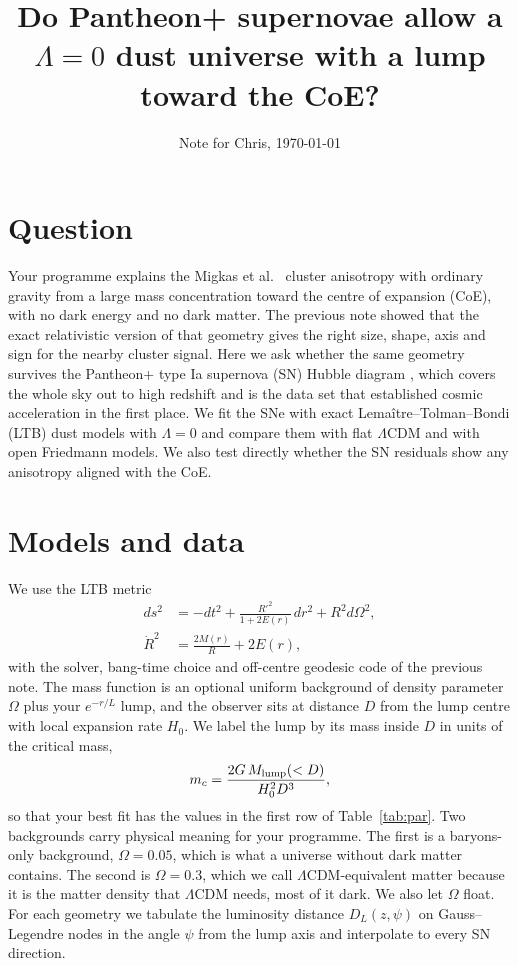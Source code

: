 \documentclass[10pt,twocolumn,letterpaper]{article}
\title{\vspace{-0.6in}\Large Do Pantheon+ supernovae allow a $\Lambda=0$ dust universe with a lump toward the CoE?}
\author{Note for Chris, \today}
\date{\vspace{-0.35in}}
\begin{document}
\maketitle

\section{Question}
Your programme explains the Migkas et al.\ \cite{Migkas2020,Migkas2021} cluster anisotropy with ordinary gravity from a large mass concentration toward the centre of expansion (CoE), with no dark energy and no dark matter. The previous note showed that the exact relativistic version of that geometry gives the right size, shape, axis and sign for the nearby cluster signal. Here we ask whether the same geometry survives the Pantheon+ type Ia supernova (SN) Hubble diagram \cite{Scolnic2022,Brout2022}, which covers the whole sky out to high redshift and is the data set that established cosmic acceleration in the first place. We fit the SNe with exact Lema\^itre--Tolman--Bondi (LTB) dust models with $\Lambda=0$ and compare them with flat $\Lambda$CDM and with open Friedmann models. We also test directly whether the SN residuals show any anisotropy aligned with the CoE.

\section{Models and data}
We use the LTB metric \cite{Bondi1947,Bolejko2011}
\begin{equation}\label{eq:ltb}
\begin{split}ds^2&=-dt^2+\frac{R'^2}{1+2E(r)}\,dr^2+R^2d\Omega^2,\\ \dot R^2&=\frac{2M(r)}{R}+2E(r),\end{split}
\end{equation}
with the solver, bang-time choice and off-centre geodesic code of the previous note. The mass function is an optional uniform background of density parameter $\Omega$ plus your $e^{-r/L}$ lump, and the observer sits at distance $D$ from the lump centre with local expansion rate $H_0$. We label the lump by its mass inside $D$ in units of the critical mass,
\begin{equation}\label{eq:mc}
m_c=\frac{2G\,M_{\rm lump}(<D)}{H_0^2D^3},
\end{equation}
so that your best fit has the values in the first row of Table~\ref{tab:par}. Two backgrounds carry physical meaning for your programme. The first is a baryons-only background, $\Omega=0.05$, which is what a universe without dark matter contains. The second is $\Omega=0.3$, which we call $\Lambda$CDM-equivalent matter because it is the matter density that $\Lambda$CDM needs, most of it dark. We also let $\Omega$ float. For each geometry we tabulate the luminosity distance $D_L(z,\psi)$ on Gauss--Legendre nodes in the angle $\psi$ from the lump axis and interpolate to every SN direction.
\end{document}
